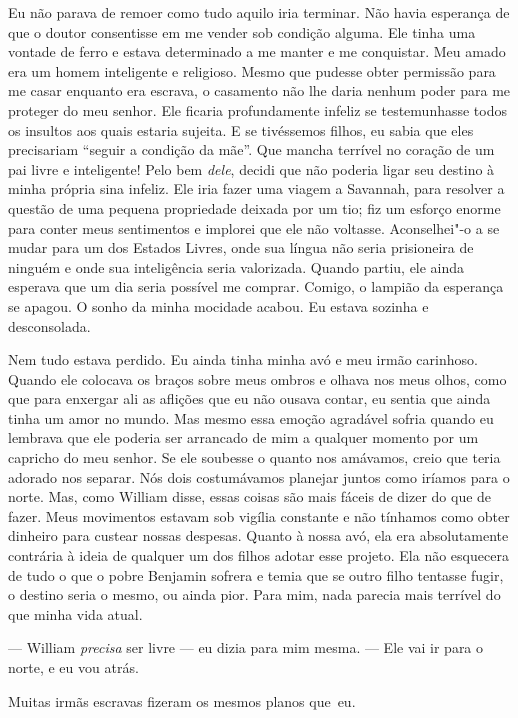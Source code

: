 Eu não parava de remoer como tudo
aquilo iria terminar. Não havia esperança de que o doutor consentisse em
me vender sob condição alguma. Ele tinha uma vontade de ferro e estava
determinado a me manter e me conquistar. Meu amado era um homem
inteligente e religioso. Mesmo que pudesse obter permissão para me casar
enquanto era escrava, o casamento não lhe daria nenhum poder para me
proteger do meu senhor. Ele ficaria profundamente infeliz se
testemunhasse todos os insultos aos quais estaria sujeita. E se
tivéssemos filhos, eu sabia que eles precisariam ``seguir a condição da
mãe''. Que mancha terrível no coração de um pai livre e inteligente!
Pelo bem \emph{dele}, decidi que não poderia ligar seu destino à minha
própria sina infeliz. Ele iria fazer uma viagem a Savannah, para
resolver a questão de uma pequena propriedade deixada por um tio; fiz um
esforço enorme para conter meus sentimentos e implorei que ele não
voltasse. Aconselhei"-o a se mudar para um dos Estados Livres, onde sua
língua não seria prisioneira de ninguém e onde sua inteligência seria
valorizada. Quando partiu, ele ainda esperava que um dia seria possível
me comprar. Comigo, o lampião da esperança se apagou. O sonho da minha
mocidade acabou. Eu estava sozinha e desconsolada.

Nem tudo estava perdido. Eu ainda tinha
minha avó e meu irmão carinhoso. Quando ele colocava os braços sobre
meus ombros e olhava nos meus olhos, como que para enxergar ali as
aflições que eu não ousava contar, eu sentia que ainda tinha um amor no
mundo. Mas mesmo essa emoção agradável sofria quando eu lembrava que ele
poderia ser arrancado de mim a qualquer momento por um capricho do meu
senhor. Se ele soubesse o quanto nos amávamos, creio que teria adorado
nos separar. Nós dois costumávamos planejar juntos como iríamos para o
norte. Mas, como William disse, essas coisas são mais fáceis de dizer do
que de fazer. Meus movimentos estavam sob vigília constante e não
tínhamos como obter dinheiro para custear nossas despesas. Quanto à
nossa avó, ela era absolutamente contrária à ideia de qualquer um dos
filhos adotar esse projeto. Ela não esquecera de tudo o que o pobre
Benjamin sofrera e temia que se outro filho tentasse fugir, o destino
seria o mesmo, ou ainda pior. Para mim, nada parecia mais terrível do
que minha vida atual.

--- William \emph{precisa} ser livre --- eu dizia para mim mesma. ---
Ele vai ir para o norte, e eu vou atrás.

Muitas irmãs escravas fizeram os mesmos planos que~eu.

